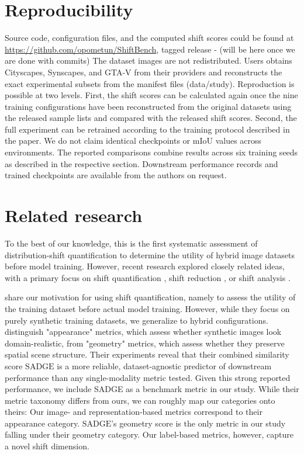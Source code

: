 \documentclass[conference]{IEEEtran}
\begin{document}
\section{Reproducibility}
Source code, configuration files, and the computed shift scores could be found at \url{https://github.com/opometun/ShiftBench}, tagged release - (will be here once we are done with commits)
The dataset images are not redistributed. Users obtains Cityscapes, Synscapes, and GTA-V from their providers 
and reconstructs the exact experimental subsets from the manifest files (data/study). 
Reproduction is possible at two levels. First, the shift scores can be calculated again once the nine training configurations have 
been reconstructed from the original datasets using the released sample lists and compared with the released shift scores. 
Second, the full experiment can be retrained according to the training protocol described in the paper. We do not claim identical checkpoints 
or mIoU values across environments. The reported comparisons combine results across six training seeds as described in the respective section. 
Downstream performance records and trained checkpoints are available from the authors on request.




\newpage
\appendices
\section{Related research}
To the best of our knowledge, this is the first systematic assessment of distribution-shift quantification to determine the utility of hybrid image datasets before model training. However, recent research explored closely related ideas, with a primary focus on shift quantification \cite{bartkowiak2026, DetectShift, duminil2024, duminil2025, shiftForModelUtility, renza2024, dale2024, li2025}, shift reduction \cite{abramov2020, liu2022_labelShift, zhang2020}, or shift analysis \cite{UrbanSyn}.

\cite{bartkowiak2026} share our motivation for using shift quantification, namely to assess the utility of the training dataset before actual model training. However, while they focus on purely synthetic training datasets, we generalize to hybrid configurations. \cite{bartkowiak2026} distinguish "appearance" metrics, which assess whether synthetic images look domain-realistic, from "geometry" metrics, which assess whether they preserve spatial scene structure. Their experiments reveal that their combined similarity score $\text{SADGE}$ is a more reliable, dataset-agnostic predictor of downstream performance than any single-modality metric tested. Given this strong reported performance, we include SADGE as a benchmark metric in our study. 
While their metric taxonomy differs from ours, we can roughly map our categories onto theirs: Our image- and representation-based metrics correspond to their appearance category. $\text{SADGE}$'s geometry score is the only metric in our study falling under their geometry category. Our label-based metrics, however, capture a novel shift dimension. 
\end{document}
